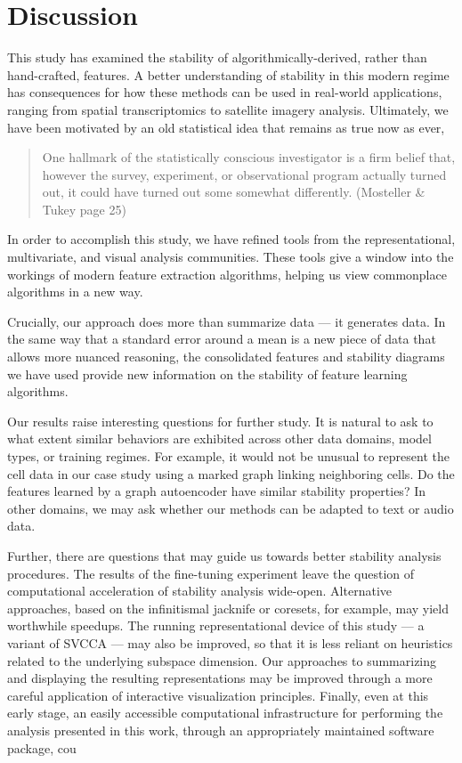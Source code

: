 
\section{Discussion}

This study has examined the stability of algorithmically-derived, rather than hand-crafted, features. A better understanding of stability in this modern regime has consequences for how these methods can be used in real-world applications, ranging from spatial transcriptomics to satellite imagery analysis. Ultimately, we have been motivated by an old statistical idea that remains as true now as ever,

\begin{quote}
One hallmark of the statistically conscious investigator is a firm belief that, however the survey, experiment, or observational program actually turned out, it could have turned out some somewhat differently. (Mosteller & Tukey page 25)
\end{quote}

In order to accomplish this study, we have refined tools from the representational, multivariate, and visual analysis communities. These tools give a window into the workings of modern feature extraction algorithms, helping us view commonplace algorithms in a new way.

Crucially, our approach does more than summarize data — it generates data. In the same way that a standard error around a mean is a new piece of data that allows more nuanced reasoning, the consolidated features and stability diagrams we have used provide new information on the stability of feature learning algorithms. 

Our results raise interesting questions for further study. It is natural to ask to what extent similar behaviors are exhibited across other data domains, model types, or training regimes. For example, it would not be unusual to represent the cell data in our case study using a marked graph linking neighboring cells. Do the features learned by a graph autoencoder have similar stability properties? In other domains, we may ask whether our methods can be adapted to text or audio data.

Further, there are questions that may guide us towards better stability analysis procedures. The results of the fine-tuning experiment leave the question of computational acceleration of stability analysis wide-open. Alternative approaches, based on the infinitismal jacknife or coresets, for example, may yield worthwhile speedups. The running representational device of this study — a variant of SVCCA — may also be improved, so that it is less reliant on heuristics related to the underlying subspace dimension. Our approaches to summarizing and displaying the resulting representations may be improved through a more careful application of interactive visualization principles. Finally, even at this early stage, an easily accessible computational infrastructure for performing the analysis presented in this work, through an appropriately maintained software package, cou
